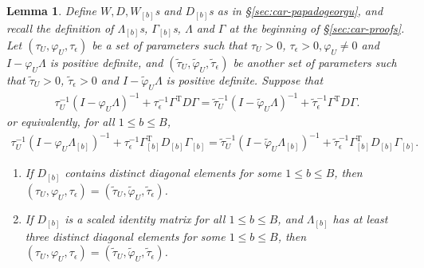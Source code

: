 \documentclass[11pt]{article}
\newtheorem{lemma}{Lemma}
\theoremstyle{definition}
\theoremstyle{remark}
\def\top{{ \mathrm{\scriptscriptstyle T} }}
\begin{document}
\begin{lemma}\label{lem:cond_Y_Z}
Define $W, D, W_{[b]}$s and $D_{[b]}$s
as in \S\ref{sec:car-papadogeorgu}, 
and recall the definition of $\Lambda_{[b]}$s,
$\Gamma_{[b]}$s, $\Lambda$ and $\Gamma$ at the beginning of \S\ref{sec:car-proofs}. 
Let $(\tau_U, \varphi_U, \tau_{\epsilon})$ be a set of parameters such that 
$\tau_U>0$, $\tau_{\epsilon}>0, \varphi_U \ne 0$ and $I-\varphi_U \Lambda$ is positive definite, 
and $(\tilde{\tau}_U, \tilde{\varphi}_U, \tilde{\tau}_{\epsilon})$ be another set of parameters such that $\tilde{\tau}_U>0$, $\tilde{\tau}_{\epsilon}>0$ and $I-\tilde{\varphi}_U \Lambda$ is positive definite.
Suppose that 
\begin{align}\label{eq:cond_Y_Z_eq}
    \tau_U^{-1} (I-\varphi_U \Lambda)^{-1} 
    +\tau_{\epsilon}^{-1} \Gamma^\top D \Gamma = 
    \tilde{\tau}_U^{-1} (I-\tilde{\varphi}_U \Lambda)^{-1} 
    +\tilde{\tau}_{\epsilon}^{-1} \Gamma^\top D \Gamma. 
\end{align}
or equivalently, for all $1\le b\le B$, 
\begin{align}\label{eq:cond_Y_Z_eq_k}
    \tau_U^{-1} (I-\varphi_U \Lambda_{[b]})^{-1} 
    +\tau_{\epsilon}^{-1} \Gamma_{[b]}^\top D_{[b]} \Gamma_{[b]} = 
    \tilde{\tau}_U^{-1} (I-\tilde{\varphi}_U \Lambda_{[b]})^{-1} 
    +\tilde{\tau}_{\epsilon}^{-1} \Gamma_{[b]}^\top D_{[b]} \Gamma_{[b]}. 
\end{align}
\begin{enumerate}[label=(\roman*)]
    \item If $D_{[b]}$ contains distinct diagonal elements for some $1\le b \le B$, 
    then $(\tau_U, \varphi_U, \tau_{\epsilon}) = (\tilde{\tau}_U, \tilde{\varphi}_U, \tilde{\tau}_{\epsilon})$.
    \item If $D_{[b]}$ is a scaled identity matrix for all $1\le b \le B$, and 
    $\Lambda_{[b]}$ has at least three distinct diagonal elements for some $1\le b \le B$,
    then $(\tau_U, \varphi_U, \tau_{\epsilon}) = (\tilde{\tau}_U, \tilde{\varphi}_U, \tilde{\tau}_{\epsilon})$. 
\end{enumerate}
\end{lemma}
\end{document}
